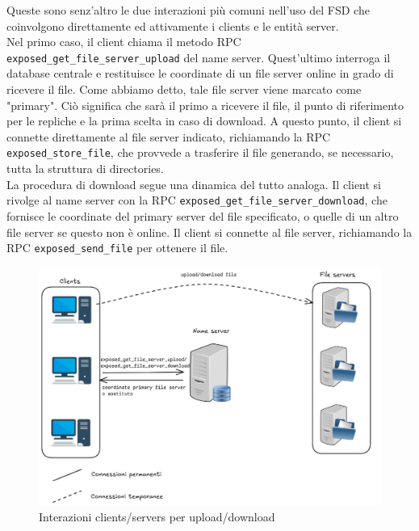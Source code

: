 \documentclass[a4paper, 12pt]{scrreprt}
\begin{document}
            Queste sono senz'altro le due interazioni più comuni nell'uso del FSD che coinvolgono direttamente ed attivamente i clients e le entità server.\\
            Nel primo caso, il client chiama il metodo RPC \texttt{exposed\_get\_file\_server\_upload} del name server. Quest'ultimo interroga il database centrale e restituisce le coordinate di un file  server online in grado di ricevere il file. Come abbiamo detto, tale file server viene marcato come "primary". Ciò significa che sarà il primo a ricevere il file, il punto di riferimento per le repliche e la prima scelta in caso di download. A questo punto, il client si connette direttamente al file server indicato, richiamando la RPC \texttt{exposed\_store\_file}, che provvede a trasferire il file generando, se necessario, tutta la struttura di directories.\\
            La procedura di download segue una dinamica del tutto analoga. Il client si rivolge al name server con la RPC \texttt{exposed\_get\_file\_server\_download}, che fornisce le coordinate del primary server del file specificato, o quelle di un altro file server se questo non è online. Il client si connette al file server, richiamando la RPC \texttt{exposed\_send\_file} per ottenere il file.

            \begin{figure}[H]
                \centering
                \includegraphics[width = .6 \textwidth]{img/upload_download.png}
                \caption{Interazioni clients/servers per upload/download}
            \end{figure}
\end{document}
